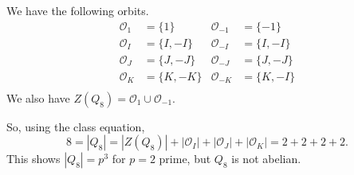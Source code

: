 \begin{example}
	We have the following orbits.
	\begin{align*}
		\mathcal O_1&=\{1\} & \mathcal O_{-1}&=\{-1\}\\
		\mathcal O_I&=\{I,-I\} & \mathcal O_{-I}&=\{I,-I\}\\
		\mathcal O_J&=\{J,-J\} & \mathcal O_{-J}&=\{J,-J\}\\
		\mathcal O_K&=\{K,-K\} & \mathcal O_{-K}&=\{K,-I\}\\
	\end{align*}
	We also have $Z(Q_8)=\mathcal O_1\cup\mathcal O_{-1}$.

	So, using the class equation,
	$$8=|Q_8|=|Z(Q_8)|+|\mathcal O_I|+|\mathcal O_J|+|\mathcal O_K|=2+2+2+2.$$
	This shows $|Q_8|=p^3$ for $p=2$ prime, but $Q_8$ is not abelian.
\end{example}
